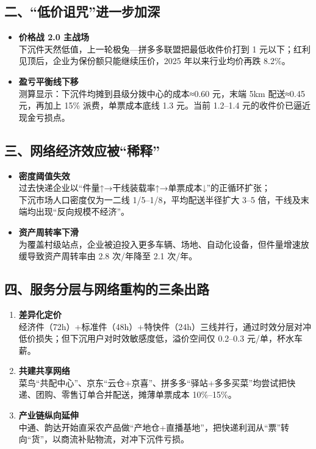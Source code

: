 \subsection{二、“低价诅咒”进一步加深}
\begin{itemize}
  \item \textbf{价格战 2.0 主战场}  \\
  下沉件天然低值，上一轮极兔—拼多多联盟把最低收件价打到 1 元以下；红利见顶后，企业为保份额只能继续压价，2025 年以来行业均价再跌 8.2\%。
  \item \textbf{盈亏平衡线下移}  \\
  测算显示：下沉件均摊到县级分拨中心的成本≈0.60 元，末端 5km 配送≈0.45 元，再加上 15\% 派费，单票成本底线 1.3 元。当前 1.2–1.4 元的收件价已逼近现金亏损点。
\end{itemize}

\subsection{三、网络经济效应被“稀释”}
\begin{itemize}
  \item \textbf{密度阈值失效}  \\
  过去快递企业以“件量↑→干线装载率↑→单票成本↓”的正循环扩张；\\下沉市场人口密度仅为一二线 1/5–1/8，平均配送半径扩大 3–5 倍，干线及末端均出现“反向规模不经济”。
  \item \textbf{资产周转率下滑}  \\
  为覆盖村级站点，企业被迫投入更多车辆、场地、自动化设备，但件量增速放缓导致资产周转率由 2.8 次/年降至 2.1 次/年。
\end{itemize}

\subsection{四、服务分层与网络重构的三条出路}
\begin{enumerate}
  \item \textbf{差异化定价}  \\
  经济件（72h）+标准件（48h）+特快件（24h）三线并行，通过时效分层对冲低价损失；但下沉用户对时效敏感度低，溢价空间仅 0.2–0.3 元/单，杯水车薪。
  \item \textbf{共建共享网络}  \\
  菜鸟“共配中心”、京东“云仓+京喜”、拼多多“驿站+多多买菜”均尝试把快递、团购、零售订单合并配送，摊薄单票成本 10\%–15\%。
  \item \textbf{产业链纵向延伸}  \\
  中通、韵达开始直采农产品做“产地仓+直播基地”，把快递利润从“票”转向“货”，以商流补贴物流，对冲下沉件亏损。
\end{enumerate}

